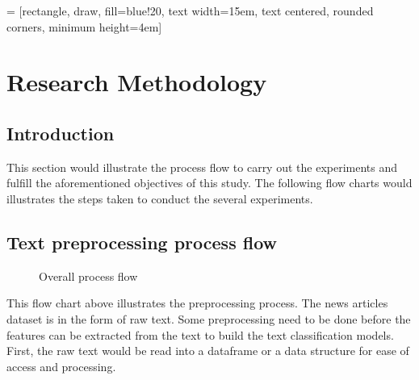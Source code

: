 
 = [rectangle, draw, fill=blue!20, 
text width=15em, text centered, rounded corners, minimum height=4em]


\chapter{Research Methodology}
\section{Introduction}
This section would illustrate the process flow to carry out the experiments and fulfill the aforementioned objectives of this study. The following flow charts would illustrates the steps taken to conduct the several experiments.

\section{Text preprocessing process flow}
\begin{figure} [ht]
\centering
{}
\caption{Overall process flow}
\label{fig: overallProcess}
\end{figure}

This flow chart above illustrates the preprocessing process. The news articles dataset is in the form of raw text. Some preprocessing need to be done before the features can be extracted from the text to build the text classification models. First, the raw text would be read into a dataframe or a data structure for ease of access and processing.

